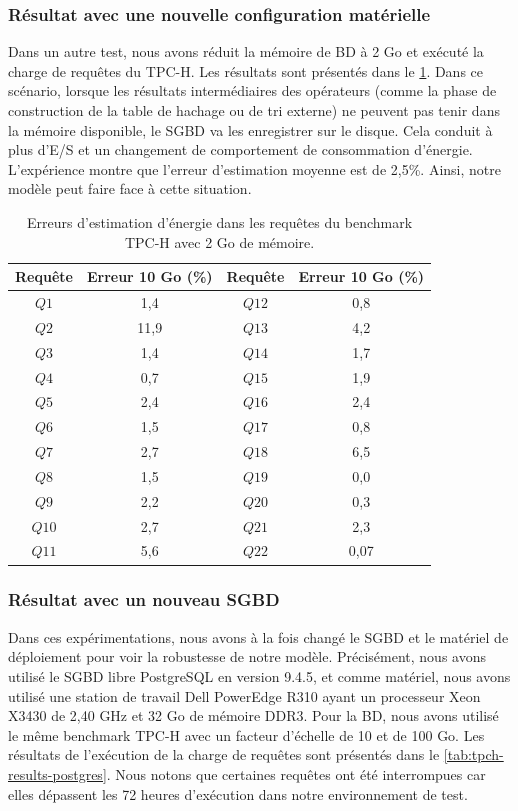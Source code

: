 \subsubsection{Résultat avec une nouvelle configuration matérielle}
Dans un autre test, nous avons réduit la mémoire de BD à 2 Go et exécuté la charge de requêtes du TPC-H. Les résultats sont présentés dans le \ref{tab:tpch-2ram-results}.
Dans ce scénario, lorsque les résultats intermédiaires des opérateurs (comme la phase de construction de la table de hachage ou de tri externe) ne peuvent pas tenir dans la mémoire disponible, le SGBD va les enregistrer sur le disque. Cela conduit à plus d'E/S et un changement de comportement de consommation d'énergie. L'expérience montre que l'erreur d'estimation moyenne est de 2,5\%. Ainsi, notre modèle peut faire face à cette situation.

\begin{table}[]
\centering
\caption {Erreurs d'estimation d'énergie dans les requêtes du benchmark TPC-H avec 2 Go de mémoire.}\label{tab:tpch-2ram-results}
\begin{tabular}{cccc}
\toprule
\textbf{Requête} & \textbf{Erreur 10 Go (\%)} & \textbf{Requête} & \textbf{Erreur 10 Go (\%)} \\ \midrule
	$Q1$ & 1,4 & $Q12$ & 0,8 \\ 
	$Q2$ & 11,9 & $Q13$ & 4,2 \\ 
	$Q3$ & 1,4 & $Q14$ & 1,7 \\
	$Q4$ & 0,7 & $Q15$ & 1,9 \\
	$Q5$ & 2,4 & $Q16$ & 2,4 \\
	$Q6$ & 1,5 & $Q17$ & 0,8 \\ 
	$Q7$ & 2,7 & $Q18$ & 6,5 \\
	$Q8$ & 1,5 & $Q19$ & 0,0 \\ 
	$Q9$ & 2,2 & $Q20$ & 0,3 \\ 
	$Q10$ & 2,7 & $Q21$ & 2,3 \\
	$Q11$ & 5,6 & $Q22$ & 0,07 \\ \bottomrule
\end{tabular}
\end{table}

\subsubsection{Résultat avec un nouveau SGBD}
Dans ces expérimentations, nous avons à la fois changé le SGBD et le matériel de déploiement  pour voir la robustesse de notre modèle. Précisément, nous avons utilisé le SGBD libre PostgreSQL en version 9.4.5, et comme matériel, nous avons utilisé une station de travail Dell PowerEdge R310 ayant un processeur Xeon X3430 de 2,40 GHz et 32 Go de mémoire DDR3. Pour la BD, nous avons utilisé le même benchmark TPC-H avec un facteur d'échelle de 10 et de 100 Go.
Les résultats de l'exécution de la charge de requêtes sont présentés dans le \ref{tab:tpch-results-postgres}.
Nous notons que certaines requêtes ont été interrompues car elles dépassent les 72 heures d'exécution dans notre environnement de test.

